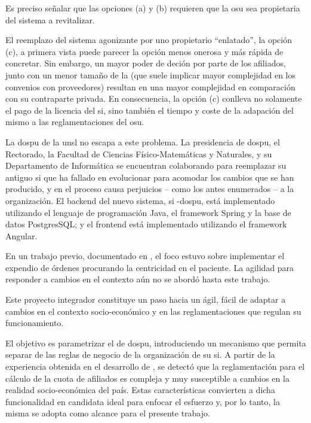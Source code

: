 Es preciso señalar que las opciones (a) y (b) requieren que la \acrshort{osu} sea propietaria del sistema a revitalizar.

El reemplazo del sistema agonizante por uno propietario ``enlatado'', la opción (c), a primera vista puede parecer la opción menos onerosa y más rápida de concretar. 
Sin embargo, un mayor poder de deción por parte de los afiliados, junto con un menor tamaño de la  (que suele implicar mayor complejidad en los convenios con proveedores) resultan en una mayor complejidad en comparación con su contraparte privada. En consecuencia, la opción (c) conlleva no solamente el pago de la licencia del \acrshort{si}, sino también el tiempo y coste de la adapación del mismo a las reglamentaciones del \acrshort{osu}.

La \acrfull{dospu} de la \acrfull{unsl} no escapa a este problema. 
La presidencia de \acrshort{dospu}, el Rectorado, la Facultad de Ciencias Físico-Matemáticas y Naturales, y su Departamento de Informática se encuentran colaborando para reemplazar su antiguo \acrshort{si} que ha fallado en evolucionar para acomodar los cambios que se han producido, y en el proceso causa perjuicios – como los antes enumerados – a la organización. 
%
El backend del nuevo sistema, \acrshort{si} -\acrshort{dospu}, está implementado utilizando el lenguaje de programación Java, el framework Spring y la base de datos PostgresSQL; y el frontend está implementado utilizando el framework Angular. 

En un trabajo previo, documentado en \cite{Vela2024}, el foco estuvo sobre implementar el expendio de órdenes procurando la centricidad en el paciente.
La agilidad para responder a cambios en el contexto aún no se abordó hasta este trabajo.

Este proyecto integrador constituye un paso hacia un {\SIOSU} ágil, fácil de adaptar a cambios en el contexto socio-económico y en las reglamentaciones que regulan su funcionamiento.

El objetivo es parametrizar el {\SIOSU} de \acrshort{dospu}, introduciendo un mecanismo que permita separar de las reglas de negocio de la organización de su \acrshort{si}. 
A partir de la experiencia obtenida en el desarrollo de {\SIDOSPU}, se detectó que la reglamentación para el cálculo de la cuota de afiliados es compleja y muy susceptible a cambios en la realidad socio-económica del país. 
Estas características convierten a dicha funcionalidad en candidata ideal para enfocar el esfuerzo y, por lo tanto, la misma se adopta como alcance para el presente trabajo.

